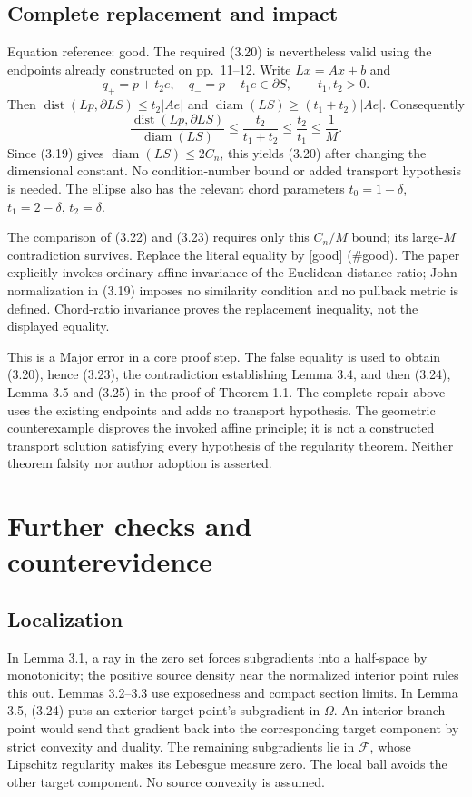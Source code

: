 \documentclass[10pt]{article}
\begin{document}
\subsection*{Complete replacement and impact}
Equation reference: good. The required (3.20) is nevertheless valid using the endpoints already constructed on pp. 11–12. Write \(Lx=Ax+b\) and \[q_+=p+t_2e,\quad q_-=p-t_1e\in\partial S,\qquad t_1,t_2>0 .\] Then \(\operatorname{dist}(Lp,\partial LS)\leq t_2|Ae|\) and \(\operatorname{diam}(LS)\geq(t_1+t_2)|Ae|\). Consequently \[
 \frac{\operatorname{dist}(Lp,\partial LS)}{\operatorname{diam}(LS)}
 \leq\frac{t_2}{t_1+t_2}
 \leq\frac{t_2}{t_1}\leq\frac1M .\] Since (3.19) gives \(\operatorname{diam}(LS)\leq2C_n\), this yields (3.20) after changing the dimensional constant. No condition-number bound or added transport hypothesis is needed. The ellipse also has the relevant chord parameters \(t_0=1-\delta\), \(t_1=2-\delta\), \(t_2=\delta\).\par
The comparison of (3.22) and (3.23) requires only this \(C_n/M\) bound; its large-\(M\) contradiction survives. Replace the literal equality by [good] (\#good). The paper explicitly invokes ordinary affine invariance of the Euclidean distance ratio; John normalization in (3.19) imposes no similarity condition and no pullback metric is defined. Chord-ratio invariance proves the replacement inequality, not the displayed equality.\par
This is a Major error in a core proof step. The false equality is used to obtain (3.20), hence (3.23), the contradiction establishing Lemma 3.4, and then (3.24), Lemma 3.5 and (3.25) in the proof of Theorem 1.1. The complete repair above uses the existing endpoints and adds no transport hypothesis. The geometric counterexample disproves the invoked affine principle; it is not a constructed transport solution satisfying every hypothesis of the regularity theorem. Neither theorem falsity nor author adoption is asserted.\par
\section*{Further checks and counterevidence}
\subsection*{Localization}
In Lemma 3.1, a ray in the zero set forces subgradients into a half-space by monotonicity; the positive source density near the normalized interior point rules this out. Lemmas 3.2–3.3 use exposedness and compact section limits. In Lemma 3.5, (3.24) puts an exterior target point’s subgradient in \(\Omega\). An interior branch point would send that gradient back into the corresponding target component by strict convexity and duality. The remaining subgradients lie in \(\mathcal F\), whose Lipschitz regularity makes its Lebesgue measure zero. The local ball avoids the other target component. No source convexity is assumed.\par
\end{document}
